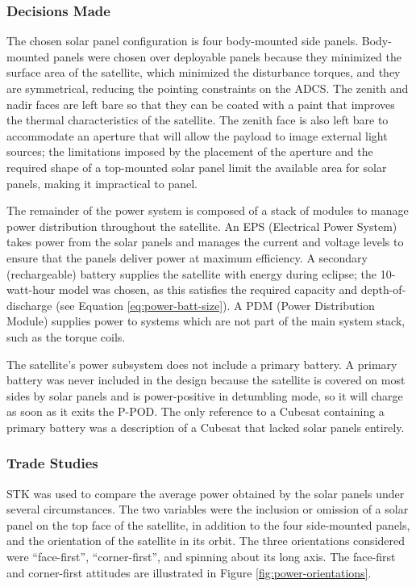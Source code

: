 \documentclass[12pt]{article}
\begin{document}
			\subsubsection{Decisions Made}
			
			The chosen solar panel configuration is four body-mounted side panels.  Body-mounted panels were chosen over deployable panels because they minimized the surface area of the satellite, which minimized the disturbance torques, and they are symmetrical, reducing the pointing constraints on the ADCS.  The zenith and nadir faces are left bare so that they can be coated with a paint that improves the thermal characteristics of the satellite.  The zenith face is also left bare to accommodate an aperture that will allow the payload to image external light sources; the limitations imposed by the placement of the aperture and the required shape of a top-mounted solar panel limit the available area for solar panels, making it impractical to panel.

The remainder of the power system is composed of a stack of modules to manage power distribution throughout the satellite.  An EPS (Electrical Power System) takes power from the solar panels and manages the current and voltage levels to ensure that the panels deliver power at maximum efficiency.  A secondary (rechargeable) battery supplies the satellite with energy during eclipse; the 10-watt-hour model was chosen, as this satisfies the required capacity and depth-of-discharge (see Equation \ref{eq:power-batt-size}).  A PDM (Power Distribution Module) supplies power to systems which are not part of the main system stack, such as the torque coils.

The satellite's power subsystem does not include a primary battery.  A primary battery was never included in the design because the satellite is covered on most sides by solar panels and is power-positive in detumbling mode, so it will charge as soon as it exits the P-POD.  The only reference to a Cubesat containing a primary battery was a description of a Cubesat that lacked solar panels entirely.\cite{libertad-1}

\subsubsection{Trade Studies}
			
			STK was used to compare the average power obtained by the solar panels under several circumstances.  The two variables were the inclusion or omission of a solar panel on the top face of the satellite, in addition to the four side-mounted panels, and the orientation of the satellite in its orbit.  The three orientations considered were ``face-first'', ``corner-first'', and spinning about its long axis.  The face-first and corner-first attitudes are illustrated in Figure \ref{fig:power-orientations}.
			
\end{document}
